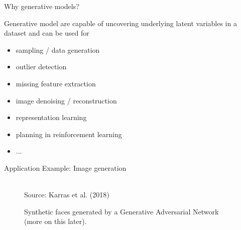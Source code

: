 \begin{frame}{Why generative models?}
    
    Generative model are capable of uncovering underlying latent variables in a dataset and
    can be used for
    
    \begin{itemize}
    \item sampling / data generation
    \item outlier detection
    \item missing feature extraction
    \item image denoising / reconstruction
    \item representation learning
    \item planning in reinforcement learning
    \item ...
    \end{itemize}
    
\end{frame}


\begin{frame} {Application Example: Image generation}
    
        \vspace{8mm}
    \begin{figure}
    \centering
    \tiny{\\Source: Karras et al. (2018)}
    \caption{Synthetic faces generated by a Generative Adversarial Network (more on this later).}
    \end{figure}

\end{frame}

